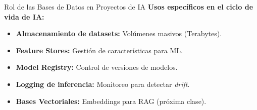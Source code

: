 \documentclass[aspectratio=169]{beamer}
\begin{document}
\begin{frame}{Rol de las Bases de Datos en Proyectos de IA}
    \textbf{Usos específicos en el ciclo de vida de IA:}
    \begin{itemize}\small
        \item \textbf{Almacenamiento de datasets:} Volúmenes masivos (Terabytes).
        \item \textbf{Feature Stores:} Gestión de características para ML.
        \item \textbf{Model Registry:} Control de versiones de modelos.
        \item \textbf{Logging de inferencia:} Monitoreo para detectar \textit{drift}.
        \item \textbf{Bases Vectoriales:} Embeddings para RAG (próxima clase).
    \end{itemize}
\end{frame}
\end{document}
